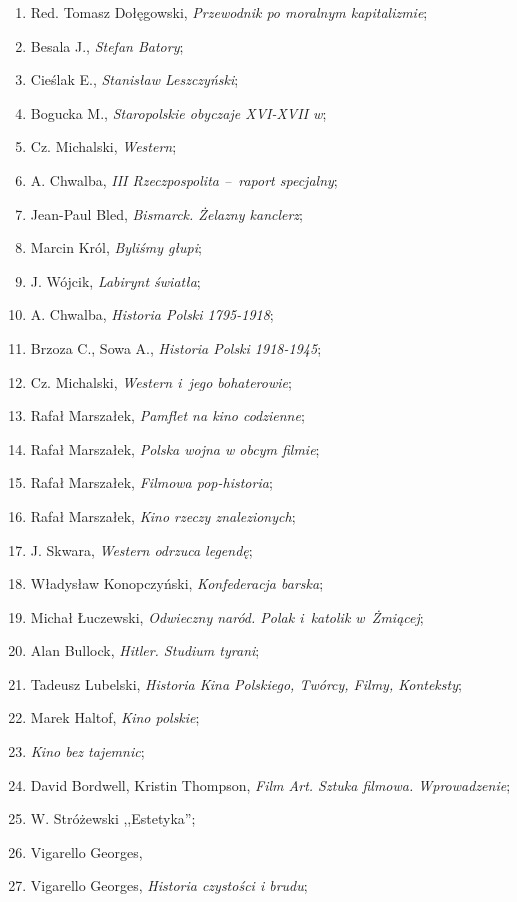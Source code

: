 \documentclass[a4paper,11pt]{article}
\begin{document}
\begin{enumerate}
{    programów politycznych przed upadkiem Rzeczypospolitej
    1734--1763};
\item Red. Tomasz Dołęgowski, \emph{Przewodnik po moralnym
    kapitalizmie};
\item Besala J., \emph{Stefan Batory};
\item Cieślak E., \emph{Stanisław Leszczyński};
\item Bogucka M., \emph{Staropolskie obyczaje XVI-XVII w};
\item Cz. Michalski, \emph{Western};
\item A. Chwalba, \emph{III Rzeczpospolita --~raport specjalny};
\item Jean-Paul Bled, \emph{Bismarck. Żelazny kanclerz};
\item Marcin Król, \emph{Byliśmy głupi};
\item J. Wójcik, \emph{Labirynt światła};
\item A. Chwalba, \emph{Historia Polski 1795-1918};
\item Brzoza C., Sowa A., \emph{Historia Polski 1918-1945};
\item Cz. Michalski, \emph{Western i~jego bohaterowie};
\item Rafał Marszałek, \emph{Pamflet na kino codzienne};
\item Rafał Marszałek, \emph{Polska wojna w obcym filmie};
\item Rafał Marszałek, \emph{Filmowa pop-historia};
\item Rafał Marszałek, \emph{Kino rzeczy znalezionych};
\item J. Skwara, \emph{Western odrzuca legendę};
\item Władysław Konopczyński, \emph{Konfederacja barska};
\item Michał Łuczewski, \emph{Odwieczny naród. Polak i~katolik
    w~Żmiącej};
\item Alan Bullock, \emph{Hitler. Studium tyrani};
\item Tadeusz Lubelski, \emph{Historia Kina Polskiego, Twórcy, Filmy,
    Konteksty};
\item Marek Haltof, \emph{Kino polskie};
\item \emph{Kino bez tajemnic};
\item David Bordwell, Kristin Thompson, \emph{Film Art. Sztuka
    filmowa. Wprowadzenie};
\item W. Stróżewski ,,Estetyka'';
\item Vigarello Georges, \emph{}
\item Vigarello Georges, \emph{Historia czystości i brudu};

\end{enumerate}
\end{document}
